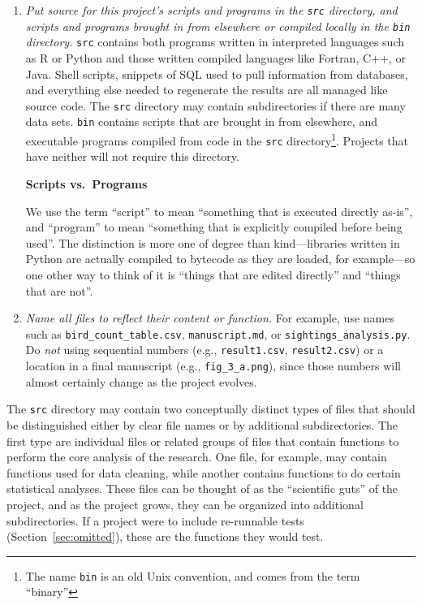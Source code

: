 \documentclass[10pt]{article}
\newcommand{\recommend}[1]{\textit{#1}}
\begin{document}
\begin{enumerate}
\item
  \recommend{Put source for this project's scripts and programs in the
    \texttt{src} directory, and scripts and programs brought in from
    elsewhere or compiled locally in the \texttt{bin} directory.}
  \texttt{src} contains both programs written in interpreted languages
  such as R or Python and those written compiled languages like
  Fortran, C++, or Java. Shell scripts, snippets of SQL used to pull
  information from databases, and everything else needed to regenerate
  the results are all managed like source code. The \texttt{src}
  directory may contain subdirectories if there are many data sets.
  \texttt{bin} contains
  scripts that are brought in from elsewhere, and executable programs
  compiled from code in the \texttt{src} directory\footnote{The name
    \texttt{bin} is an old Unix convention, and comes from the term
    ``binary''}. Projects that have neither will not require this
  directory.

  \begin{framed}
    \noindent \textbf{Scripts vs.\ Programs}

    We use the term ``script'' to mean ``something that is executed
    directly as-is'', and ``program'' to mean ``something that is
    explicitly compiled before being used''.  The distinction is more
    one of degree than kind---libraries written in Python are actually
    compiled to bytecode as they are loaded, for example---so one
    other way to think of it is ``things that are edited directly''
    and ``things that are not''.
  \end{framed}

\item
  \recommend{Name all files to reflect their content or function.} For
  example, use names such as \texttt{bird\_count\_table.csv},
  \texttt{manuscript.md}, or \texttt{sightings\_analysis.py}.  Do
  \emph{not} using sequential numbers (e.g., \texttt{result1.csv},
  \texttt{result2.csv}) or a location in a final manuscript (e.g.,
  \texttt{fig\_3\_a.png}), since those numbers will almost certainly
  change as the project evolves.

\end{enumerate}

The \texttt{src} directory may contain two conceptually distinct types
of files that should be distinguished either by clear file names or by
additional subdirectories. The first type are individual files or
related groups of files that contain functions to perform the core
analysis of the research. One file, for example, may contain functions
used for data cleaning, while another contains functions to do certain
statistical analyses. These files can be thought of as the
``scientific guts'' of the project, and as the project grows, they can
be organized into additional subdirectories. If a project were to
include re-runnable tests (Section~\ref{sec:omitted}), these are the
functions they would test.
\end{document}
